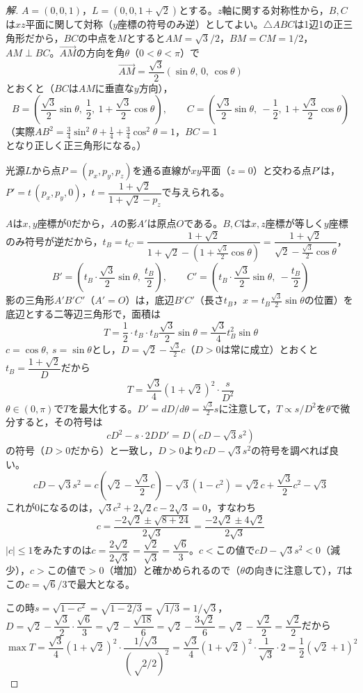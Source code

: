\documentclass[../main.tex]{subfiles}
\begin{document}
\begin{proof}[解]
  $A=(0,0,1)$，$L=(0,0,1+\sqrt2)$とする。$z$軸に関する対称性から，$B,C$は$xz$平面に関して対称（$y$座標の符号のみ逆）としてよい。$\triangle ABC$は1辺1の正三角形だから，$BC$の中点を$M$とすると$AM=\sqrt3/2$，$BM=CM=1/2$，$AM\perp BC$。$\overrightarrow{AM}$の方向を角$\theta$（$0<\theta<\pi$）で
  \[
    \overrightarrow{AM}=\frac{\sqrt3}2(\sin\theta,\,0,\,\cos\theta)
  \]
  とおくと（$BC$は$AM$に垂直な$y$方向），
  \[
    B=\left(\frac{\sqrt3}2\sin\theta,\ \frac12,\ 1+\frac{\sqrt3}2\cos\theta\right),\qquad
    C=\left(\frac{\sqrt3}2\sin\theta,\ -\frac12,\ 1+\frac{\sqrt3}2\cos\theta\right)
  \]
  （実際$AB^2=\frac34\sin^2\theta+\frac14+\frac34\cos^2\theta=1$，$BC=1$となり正しく正三角形になる。）

  光源$L$から点$P=(p_x,p_y,p_z)$を通る直線が$xy$平面（$z=0$）と交わる点$P'$は，$P'=t\,(p_x,p_y,0)$，$t=\dfrac{1+\sqrt2}{1+\sqrt2-p_z}$で与えられる。

  $A$は$x,y$座標が$0$だから，$A$の影$A'$は原点$O$である。$B,C$は$x,z$座標が等しく$y$座標のみ符号が逆だから，$t_B=t_C=\dfrac{1+\sqrt2}{1+\sqrt2-\left(1+\frac{\sqrt3}2\cos\theta\right)}=\dfrac{1+\sqrt2}{\sqrt2-\frac{\sqrt3}2\cos\theta}$，
  \[
    B'=\left(t_B\cdot\frac{\sqrt3}2\sin\theta,\ \frac{t_B}2\right),\qquad C'=\left(t_B\cdot\frac{\sqrt3}2\sin\theta,\ -\frac{t_B}2\right)
  \]
  影の三角形$A'B'C'$（$A'=O$）は，底辺$B'C'$（長さ$t_B$，$x=t_B\frac{\sqrt3}2\sin\theta$の位置）を底辺とする二等辺三角形で，面積は
  \[
    T=\frac12\cdot t_B\cdot t_B\frac{\sqrt3}2\sin\theta=\frac{\sqrt3}4t_B^2\sin\theta
  \]
  $c=\cos\theta,\ s=\sin\theta$とし，$D=\sqrt2-\frac{\sqrt3}2c$（$D>0$は常に成立）とおくと$t_B=\dfrac{1+\sqrt2}D$だから
  \[
    T=\frac{\sqrt3}4(1+\sqrt2)^2\cdot\frac s{D^2}
  \]
  $\theta\in(0,\pi)$で$T$を最大化する。$D'=dD/d\theta=\frac{\sqrt3}2s$に注意して，$T\propto s/D^2$を$\theta$で微分すると，その符号は
  \[
    cD^2-s\cdot2DD'=D(cD-\sqrt3s^2)
  \]
  の符号（$D>0$だから）と一致し，$D>0$より$cD-\sqrt3s^2$の符号を調べれば良い。
  \[
    cD-\sqrt3s^2=c\left(\sqrt2-\frac{\sqrt3}2c\right)-\sqrt3(1-c^2)=\sqrt2c+\frac{\sqrt3}2c^2-\sqrt3
  \]
  これが$0$になるのは，$\sqrt3c^2+2\sqrt2c-2\sqrt3=0$，すなわち
  \[
    c=\frac{-2\sqrt2\pm\sqrt{8+24}}{2\sqrt3}=\frac{-2\sqrt2\pm4\sqrt2}{2\sqrt3}
  \]
  $|c|\le1$をみたすのは$c=\dfrac{2\sqrt2}{2\sqrt3}=\dfrac{\sqrt2}{\sqrt3}=\dfrac{\sqrt6}3$。$c<$この値で$cD-\sqrt3s^2<0$（減少），$c>$この値で$>0$（増加）と確かめられるので（$\theta$の向きに注意して），$T$はこの$c=\sqrt6/3$で最大となる。

  この時$s=\sqrt{1-c^2}=\sqrt{1-2/3}=\sqrt{1/3}=1/\sqrt3$，$D=\sqrt2-\dfrac{\sqrt3}2\cdot\dfrac{\sqrt6}3=\sqrt2-\dfrac{\sqrt{18}}6=\sqrt2-\dfrac{3\sqrt2}6=\sqrt2-\dfrac{\sqrt2}2=\dfrac{\sqrt2}2$だから
  \[
    \max T=\frac{\sqrt3}4(1+\sqrt2)^2\cdot\frac{1/\sqrt3}{(√2/2)^2}=\frac{\sqrt3}4(1+\sqrt2)^2\cdot\frac1{\sqrt3}\cdot2=\frac12(\sqrt2+1)^2
  \]
\end{proof}
\end{document}
